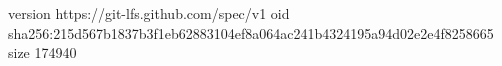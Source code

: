 version https://git-lfs.github.com/spec/v1
oid sha256:215d567b1837b3f1eb62883104ef8a064ac241b4324195a94d02e2e4f8258665
size 174940
